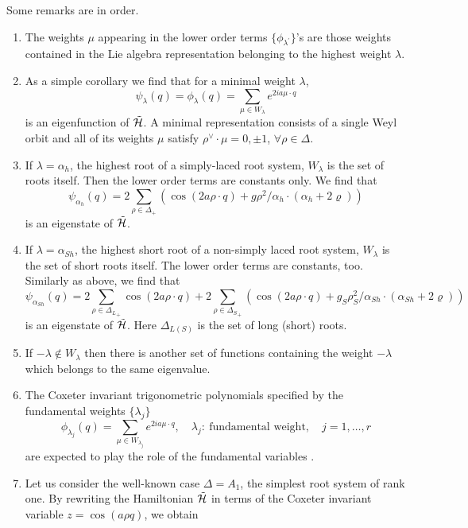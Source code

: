 \documentclass[a4paper,12pt]{article}
\begin{document}
\bigskip
Some remarks are in order.
\begin{enumerate}
\item  The weights \(\mu\) appearing in the lower order terms
\(\{\phi_{\lambda^\prime}\}\)'s are those weights contained in the
Lie algebra representation belonging to the highest weight
\(\lambda\).
\item
As a simple corollary we find that for a minimal weight
\(\lambda\),
\[
   \psi_{\lambda}(q)=\phi_{\lambda}(q)=\sum_{\mu\in
   W_{\lambda}}e^{2ia\mu\cdot q}
\]
 is an eigenfunction of \(\tilde{\cal H}\).
A minimal representation \cite{bcs1} consists of a single Weyl orbit
and all of
its weights \(\mu\) satisfy \(\rho^\vee\!\cdot\mu=0,\pm1\), \(\forall
\rho\in\Delta\).
\item
If \(\lambda=\alpha_h\), the highest root of a simply-laced root
system, \(W_\lambda\) is the set of roots itself. Then the lower
order terms are constants only. We find that
\[
  \psi_{\alpha_h}(q)= 2\sum_{\rho\in\Delta_+}\!
   \left(\cos{(2a\rho\cdot
   q)}+g\rho^2/\alpha_h\cdot(\alpha_h+2\varrho)\right)
\]
is an eigenstate of \(\tilde{\cal H}\).
\item
If \(\lambda=\alpha_{Sh}\), the highest short root of a non-simply
laced root system, \(W_\lambda\) is the set of short roots itself.
The lower
order terms are constants, too.
Similarly as above, we find that
\[
  \psi_{\alpha_{Sh}}(q)= 2\sum_{\rho\in{\Delta_L}_+}\!
   \cos{(2a\rho\cdot q)}+2\sum_{\rho\in{\Delta_S}_+}\!
   \left(\cos{(2a\rho\cdot
   q)}+g_S\rho_S^2/\alpha_{Sh}\cdot(\alpha_{Sh}+2\varrho)\right)
\]
is an eigenstate of \(\tilde{\cal H}\). Here \(\Delta_{L(S)}\) is the
set of long (short) roots.
\item
If \(-\lambda\notin W_{\lambda}\) then
there is   another set of functions containing the weight
\(-\lambda\) which belongs to  the same eigenvalue.
\item
The  Coxeter invariant trigonometric polynomials specified by
the fundamental weights \(\{\lambda_j\}\)
\begin{equation}
   \phi_{\lambda_j}(q)=\sum_{\mu\in
   W_{\lambda_j}}e^{2ia\mu\cdot q},\quad \lambda_j:\
\mbox{fundamental weight},
   \quad j=1,\ldots,r
\end{equation}
are expected to play the role of the fundamental
variables \cite{HeOp,ruhl}.
\item
Let us consider the well-known case \(\Delta=A_1\),
the simplest  root system of
rank one. By rewriting the Hamiltonian \(\tilde{\cal H}\)
in terms of the Coxeter
invariant variable \(z=\cos(a\rho q)\), we obtain

\end{enumerate}
\end{document}
